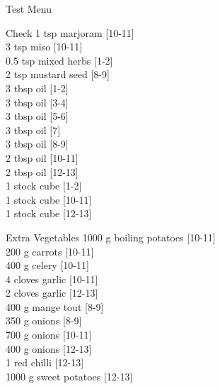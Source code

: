 \begin{menu}{Test Menu}
\begin{shoppinglist}{Check}
      1 tsp marjoram 
        {\scriptsize[10-11]}\\
      3 tsp miso 
        {\scriptsize[10-11]}\\
      0.5 tsp mixed herbs 
        {\scriptsize[1-2]}\\
      2 tsp mustard seed 
        {\scriptsize[8-9]}\\
      3 tbsp oil 
        {\scriptsize[1-2]}\\
      3 tbsp oil 
        {\scriptsize[3-4]}\\
      3 tbsp oil 
        {\scriptsize[5-6]}\\
      3 tbsp oil 
        {\scriptsize[7]}\\
      3 tbsp oil 
        {\scriptsize[8-9]}\\
      2 tbsp oil 
        {\scriptsize[10-11]}\\
      2 tbsp oil 
        {\scriptsize[12-13]}\\
      1  stock cube 
        {\scriptsize[1-2]}\\
      1  stock cube 
        {\scriptsize[10-11]}\\
      1  stock cube 
        {\scriptsize[12-13]}\\
      \end{shoppinglist}%
      \begin{shoppinglist}{Extra Vegetables}
      1000 g boiling potatoes 
        {\scriptsize[10-11]}\\
      200 g carrots 
        {\scriptsize[10-11]}\\
      400 g celery 
        {\scriptsize[10-11]}\\
      4 cloves garlic 
        {\scriptsize[10-11]}\\
      2 cloves garlic 
        {\scriptsize[12-13]}\\
      400 g mange tout 
        {\scriptsize[8-9]}\\
      350 g onions 
        {\scriptsize[8-9]}\\
      700 g onions 
        {\scriptsize[10-11]}\\
      400 g onions 
        {\scriptsize[12-13]}\\
      1  red chilli 
        {\scriptsize[12-13]}\\
      1000 g sweet potatoes 
        {\scriptsize[12-13]}\\
      \end{shoppinglist}%
      \par\vfil %
    \vfil\clearpage
  

\end{menu}
